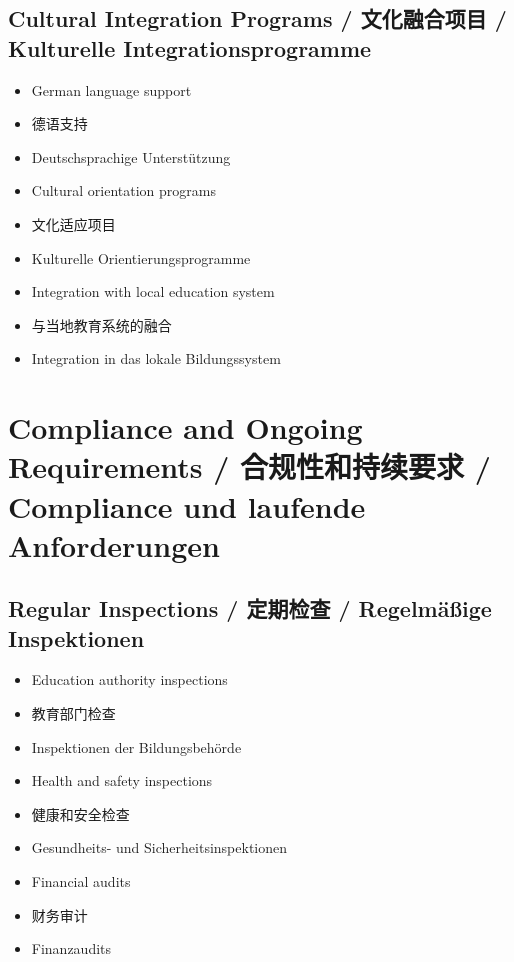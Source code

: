 \subsection{Cultural Integration Programs / 文化融合项目 / Kulturelle Integrationsprogramme}
\begin{itemize}
    \item German language support
    \item 德语支持
    \item Deutschsprachige Unterstützung
    \item Cultural orientation programs
    \item 文化适应项目
    \item Kulturelle Orientierungsprogramme
    \item Integration with local education system
    \item 与当地教育系统的融合
    \item Integration in das lokale Bildungssystem
\end{itemize}

\section{Compliance and Ongoing Requirements / 合规性和持续要求 / Compliance und laufende Anforderungen}

\subsection{Regular Inspections / 定期检查 / Regelmäßige Inspektionen}
\begin{itemize}
    \item Education authority inspections
    \item 教育部门检查
    \item Inspektionen der Bildungsbehörde
    \item Health and safety inspections
    \item 健康和安全检查
    \item Gesundheits- und Sicherheitsinspektionen
    \item Financial audits
    \item 财务审计
    \item Finanzaudits
\end{itemize}


